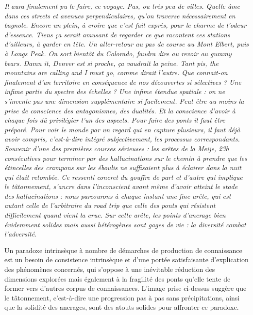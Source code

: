 {\textit{Il aura finalement pu le faire, ce voyage. Pas, ou très peu de villes. Quelle âme dans ces \emph{streets} et \emph{avenues} perpendiculaires, qu'on traverse nécessairement en bagnole. Encore un plein, à croire que c'est fait exprès, pour le charme de l'odeur d'essence. Tiens ça serait amusant de regarder ce que racontent ces stations d'ailleurs, à garder en tête. Un aller-retour au pas de course au Mont Elbert, puis à Longs Peak. On sort bientôt du Colorado, faudra dire au revoir au gummy bears. Damn it, Denver est si proche, ça vaudrait la peine. Tant pis, the mountains are calling and I must go, comme dirait l'autre. Que connait-on finalement d'un territoire en conséquence de nos découvertes si sélectives ? Une infime partie du spectre des échelles ? Une infime étendue spatiale : on ne s'invente pas une dimension supplémentaire si facilement. Peut être au moins la prise de conscience des antagonismes, des dualités. Et la conscience d'avoir à chaque fois dû privilégier l'un des aspects. Pour faire des ponts il faut être préparé. Pour voir le monde par un regard qui en capture plusieurs, il faut déjà avoir \emph{compris}, c'est-à-dire intégré subjectivement, les processus correspondants. Souvenir d'une des premières courses sérieuses : les arêtes de la Meije, 23h consécutives pour terminer par des hallucinations sur le chemin à prendre que les étincelles des crampons sur les éboulis ne suffisaient plus à éclairer dans la nuit qui était retombée. Ce ressenti concret du gouffre de part et d'autre qui implique le tâtonnement, s'ancre dans l'inconscient avant même d'avoir atteint le stade des hallucinations : nous parcourons à chaque instant une fine arête, qui est autant celle de l'arbitraire du road trip que celle des ponts qui résistent difficilement quand vient la crue. Sur cette arête, les points d'ancrage bien évidemment solides mais aussi hétérogènes sont gages de vie : la diversité combat l'adversité.}
}




\bigskip










Un paradoxe intrinsèque à nombre de démarches de production de connaissance est un besoin de consistence intrinsèque et d'une portée satisfaisante d'explication des phénomènes concernés, qui s'oppose à une inévitable réduction des dimensions explorées mais également à la fragilité des ponts qu'elle tente de former vers d'autres corpus de connaissances. L'image prise ci-dessus suggère que le tâtonnement, c'est-à-dire une progression pas à pas sans précipitations, ainsi que la solidité des ancrages, sont des atouts solides pour affronter ce paradoxe.

